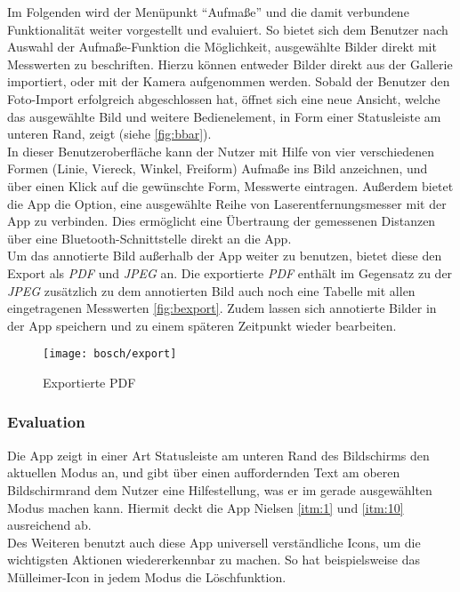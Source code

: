 Im Folgenden wird der Menüpunkt ``Aufmaße'' und die damit verbundene Funktionalität weiter vorgestellt und evaluiert.
So bietet sich dem Benutzer nach Auswahl der Aufmaße-Funktion die Möglichkeit, ausgewählte Bilder direkt mit Messwerten zu beschriften.
Hierzu können entweder Bilder direkt aus der Gallerie importiert, oder mit der Kamera aufgenommen werden.
Sobald der Benutzer den Foto-Import erfolgreich abgeschlossen hat, öffnet sich eine neue Ansicht, welche das ausgewählte Bild und weitere Bedienelement, in Form einer Statusleiste am unteren Rand, zeigt (siehe \autoref{fig:bbar}). \\

In dieser Benutzeroberfläche kann der Nutzer mit Hilfe von vier verschiedenen Formen (Linie, Viereck, Winkel, Freiform) Aufmaße ins Bild anzeichnen, und über einen Klick auf die gewünschte Form, Messwerte eintragen.
Außerdem bietet die App die Option, eine ausgewählte Reihe von Laserentfernungsmesser mit der App zu verbinden.
Dies ermöglicht eine Übertraung der gemessenen Distanzen über eine Bluetooth-Schnittstelle direkt an die App. \\

Um das annotierte Bild außerhalb der App weiter zu benutzen, bietet diese den Export als \emph{PDF} und \emph{JPEG} an.
Die exportierte \emph{PDF} enthält im Gegensatz zu der \emph{JPEG} zusätzlich zu dem annotierten Bild auch noch eine Tabelle mit allen eingetragenen Messwerten \autoref{fig:bexport}. 
Zudem lassen sich annotierte Bilder in der App speichern und zu einem späteren Zeitpunkt wieder bearbeiten.

\begin{figure}[h]
  \centering
  \texttt{[image: bosch/export]}
  \caption{Exportierte PDF}
  \label{fig:bexport}
\end{figure}

\subsubsection{Evaluation}

Die App zeigt in einer Art Statusleiste am unteren Rand des Bildschirms den aktuellen Modus an, und gibt über einen auffordernden Text am oberen Bildschirmrand dem Nutzer eine Hilfestellung, was er im gerade ausgewählten Modus machen kann.  Hiermit deckt die App Nielsen \ref{itm:1} und \ref{itm:10} ausreichend ab. \\

Des Weiteren benutzt auch diese App universell verständliche Icons, um die wichtigsten Aktionen wiedererkennbar zu machen. So hat beispielsweise das Mülleimer-Icon in jedem Modus die Löschfunktion. \\

